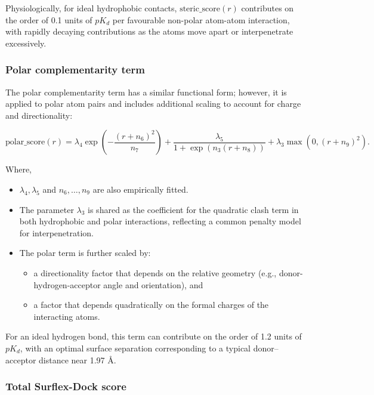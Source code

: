 \documentclass[12pt]{article}
\begin{document}
Physiologically, for ideal hydrophobic contacts, $\textrm{steric\_score}(r)$ contributes on the order of 0.1 units of $pK_d$ per favourable non-polar atom-atom interaction, with rapidly decaying contributions as the atoms move apart or interpenetrate excessively\cite{CH7_Jain2007Surflex21}.

\subsubsection{Polar complementarity term}

The polar complementarity term\cite{CH7_Jain2007Surflex21} has a similar functional form; however, it is applied to polar atom pairs and includes additional scaling to account for charge and directionality:

\begin{equation}
  \textrm{polar\_score}(r)
  =
  \lambda_{4} \exp\!\left(
    -\frac{\left(r + n_{6}\right)^{2}}{n_{7}}
  \right)
  +
  \frac{\lambda_{5}}{
    1 + \exp\!\left(
      n_{3} \left( r + n_{8} \right)
    \right)
  }
  +
  \lambda_{3} \max\!\left( 0,\left( r + n_{9} \right)^{2} \right).
  \label{eq:polar}
\end{equation}

Where,
\begin{itemize}
  \item $\lambda_{4}, \lambda_{5}$ and $n_{6}, \dots, n_{9}$ are also empirically fitted.
  \item The parameter $\lambda_{3}$ is shared as the coefficient for the quadratic clash term in both hydrophobic and polar interactions, reflecting a common penalty model for interpenetration.
  \item The polar term is further scaled by:
  \begin{itemize}
    \item a directionality factor that depends on the relative geometry (e.g., donor-hydrogen-acceptor angle and orientation), and
    \item a factor that depends quadratically on the formal charges of the interacting atoms.
  \end{itemize}
\end{itemize}

For an ideal hydrogen bond, this term can contribute on the order of 1.2 units of \(pK_d\), with an optimal surface separation corresponding to a typical donor--acceptor distance near 1.97 \r{A}\cite{CH7_Jain2007Surflex21}.

\subsubsection{Total Surflex-Dock score}
\end{document}
